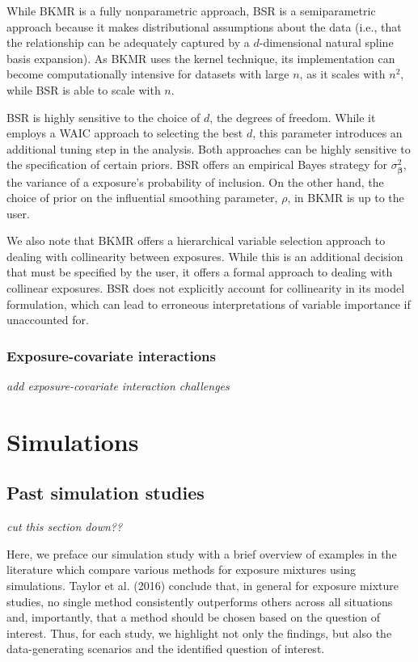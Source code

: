 \documentclass[12pt, twoside]{amherstthesis}
\begin{document}
While BKMR is a fully nonparametric approach, BSR is a semiparametric approach because it makes distributional assumptions about the data (i.e., that the relationship can be adequately captured by a \(d\)-dimensional natural spline basis expansion). As BKMR uses the kernel technique, its implementation can become computationally intensive for datasets with large \(n\), as it scales with \(n^2\), while BSR is able to scale with \(n\).

BSR is highly sensitive to the choice of \(d\), the degrees of freedom. While it employs a WAIC approach to selecting the best \(d\), this parameter introduces an additional tuning step in the analysis. Both approaches can be highly sensitive to the specification of certain priors. BSR offers an empirical Bayes strategy for \(\sigma^2_{\boldsymbol\beta}\), the variance of a exposure's probability of inclusion. On the other hand, the choice of prior on the influential smoothing parameter, \(\rho\), in BKMR is up to the user.

We also note that BKMR offers a hierarchical variable selection approach to dealing with collinearity between exposures. While this is an additional decision that must be specified by the user, it offers a formal approach to dealing with collinear exposures. BSR does not explicitly account for collinearity in its model formulation, which can lead to erroneous interpretations of variable importance if unaccounted for.

\hypertarget{exposure-covariate-interactions}{%
\subsection{Exposure-covariate interactions}\label{exposure-covariate-interactions}}

\emph{add exposure-covariate interaction challenges}

\hypertarget{sims}{%
\chapter{Simulations}\label{sims}}

\hypertarget{past-simulation-studies}{%
\section{Past simulation studies}\label{past-simulation-studies}}

\emph{cut this section down??}

Here, we preface our simulation study with a brief overview of examples in the literature which compare various methods for exposure mixtures using simulations. Taylor et al. (2016) conclude that, in general for exposure mixture studies, no single method consistently outperforms others across all situations and, importantly, that a method should be chosen based on the question of interest. Thus, for each study, we highlight not only the findings, but also the data-generating scenarios and the identified question of interest.
\end{document}
